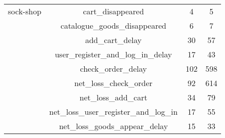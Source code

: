 \begin{table}[htbp]
\begin{tabular}{cccc}
    sock-shop    & cart\_disappeared                       & 4        & 5          \\
                 & catalogue\_goods\_disappeared           & 6        & 7          \\
                 & add\_cart\_delay                        & 30       & 57         \\
                 & user\_register\_and\_log\_in\_delay     & 17       & 43         \\
                 & check\_order\_delay                     & 102      & 598        \\
                 & net\_loss\_check\_order                 & 92       & 614        \\
                 & net\_loss\_add\_cart                    & 34       & 79         \\
                 & net\_loss\_user\_register\_and\_log\_in & 17       & 55         \\
                 & net\_loss\_goods\_appear\_delay         & 15       & 33         \\ \bottomrule[2pt]
    \end{tabular}
\end{table}

